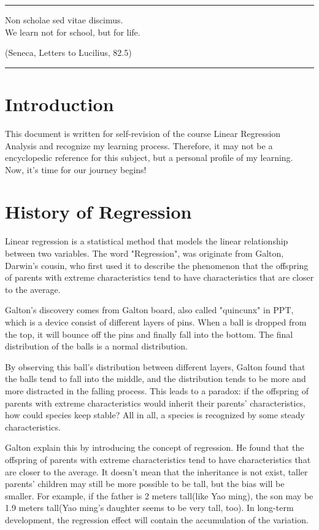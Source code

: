 \documentclass[a4paper]{article}
\begin{document}
\courseheader
{}


\rule{\textwidth}{1pt}
Non scholae sed vitae discimus.\\
We learn not for school, but for life. \\
\begin{flushright}
  (Seneca, Letters to Lucilius, 82.5)
\end{flushright}
\rule{\textwidth}{1pt}
\vspace{2em}

\section{Introduction}
This document is written for self-revision of the course Linear Regression Analysis and recognize my learning process. Therefore, it may not be a encyclopedic reference for this subject, but a personal profile of my learning. Now, it's time for our journey begins!
\section{History of Regression}
Linear regression is a statistical method that models the linear relationship between two variables. The word "Regression", was originate from Galton, Darwin's cousin, who first used it to describe the phenomenon that the offspring of parents with extreme characteristics tend to have characteristics that are closer to the average. \par
Galton's discovery comes from Galton board, also called "quincunx" in PPT, which is a device consist of different layers of pins. When a ball is dropped from the top, it will bounce off the pins and finally fall into the bottom. The final distribution of the balls is a normal distribution.\par
By observing this ball's distribution between different layers, Galton found that the balls tend to fall into the middle, and the distribution tends to be more and more distracted in the falling process. This leads to a paradox: if the offspring of parents with extreme characteristics would inherit their parents' characteristics, how could species keep stable? All in all, a species is recognized by some steady characteristics. \par
Galton explain this by introducing the concept of regression. He found that the offspring of parents with extreme characteristics tend to have characteristics that are closer to the average. It doesn't mean that the inheritance is not exist, taller parents' children may still be more possible to be tall, but the bias will be smaller. For example, if the father is 2 meters tall(like Yao ming), the son may be 1.9 meters tall(Yao ming's daughter seems to be very tall, too). In long-term development, the regression effect will contain the accumulation of the variation. \par
\end{document}
